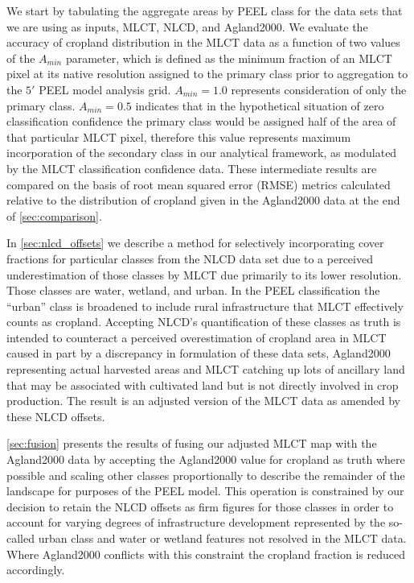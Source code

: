 We start by tabulating the aggregate areas by PEEL class for the data
sets that we are using as inputs, MLCT, NLCD, and Agland2000.  We
evaluate the accuracy of cropland distribution in the MLCT data as a
function of two values of the $A_{min}$ parameter, which is defined as
the minimum fraction of an MLCT pixel at its native resolution
assigned to the primary class prior to aggregation to the $5'$ PEEL
model analysis grid.  $A_{min}=1.0$ represents consideration of only
the primary class.  $A_{min}=0.5$ indicates that in the hypothetical
situation of zero classification confidence the primary class would be
assigned half of the area of that particular MLCT pixel, therefore
this value represents maximum incorporation of the secondary class in
our analytical framework, as modulated by the MLCT classification
confidence data.  These intermediate results are compared on the basis
of root mean squared error (RMSE) metrics calculated relative to the
distribution of cropland given in the Agland2000 data at the end of
\autoref{sec:comparison}.

In \autoref{sec:nlcd_offsets} we describe a method for selectively
incorporating cover fractions for particular classes from the NLCD
data set due to a perceived underestimation of those classes by MLCT
due primarily to its lower resolution.  Those classes are water,
wetland, and urban.  In the PEEL classification the ``urban'' class is
broadened to include rural infrastructure that MLCT effectively counts
as cropland.  Accepting NLCD's quantification of these classes as
truth is intended to counteract a perceived overestimation of cropland
area in MLCT caused in part by a discrepancy in formulation of these
data sets, Agland2000 representing actual harvested areas and MLCT
catching up lots of ancillary land that may be associated with
cultivated land but is not directly involved in crop production. The
result is an adjusted version of the MLCT data as amended by these
NLCD offsets.


\autoref{sec:fusion} presents the results of fusing our adjusted MLCT
map with the Agland2000 data by accepting the Agland2000 value for
cropland as truth where possible and scaling other classes
proportionally to describe the remainder of the landscape for
purposes of the PEEL model.  This operation is constrained by our
decision to retain the NLCD offsets as firm figures for those classes
in order to account for varying degrees of infrastructure development
represented by the so-called urban class and water or wetland features
not resolved in the MLCT data.  Where Agland2000 conflicts with this
constraint the cropland fraction is reduced accordingly.

